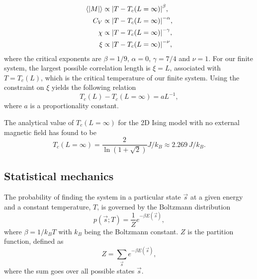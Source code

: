 \begin{align}
    \expval{\abs{M}} & \propto \abs{T - T_c(L=\infty)}^\beta, \label{eq:crit_expo_mag} \\
    C_V & \propto \abs{T - T_c(L=\infty)}^{-\alpha}, \label{eq:crit_expo_heatcap} \\ 
    \chi & \propto \abs{T - T_c(L=\infty)}^{-\gamma}, \label{eq:crit_expo_mag_susc} \\ 
    \xi & \propto \abs{T - T_c(L=\infty)}^{-\nu}, \label{eq:crit_expo_corr_length}
\end{align}
where the critical exponents are $\beta=1/9$, $\alpha=0$, $\gamma=7/4$ and $\nu=1$. For our finite system, the largest possible correlation length is $\xi=L$, associated with $T=T_c(L)$, which is the critical temperature of our finite system. Using the constraint on $\xi$ yields the following relation 
\begin{equation}
    T_c(L) - T_c(L=\infty) = aL^{-1}, \label{eq:finite_size_scaling_relation}
\end{equation}  
where $a$ is a proportionality constant. 

The analytical value of $T_c(L=\infty)$ for the 2D Ising model with no external magnetic field has found to be \cite{Onsager_Ising2D}
\begin{equation}
    T_c(L=\infty) = \frac{2}{\ln(1+\sqrt{2})} J/k_B \approx 2.269\,J/k_B. \label{eq:onsager_critical_temperature}
\end{equation}


\subsection{Statistical mechanics}\label{subsec_theory:statistical_mechanics}

The probability of finding the system in a particular state $\vec{s}$ at a given energy and a constant temperature, $T$, is governed by the Boltzmann distribution 
\begin{equation}\label{eq:boltzmann_distr}
    p(\vec{s};T) = \frac{1}{Z}e^{-\beta E(\vec{s})}, 
\end{equation} 
where $\beta=1/k_B T$ with $k_B$ being the Boltzmann constant. $Z$ is the partition function, defined as 
\begin{equation}\label{eq:partition_function}
    Z = \sum_\vec{s} e^{-\beta E(\vec{s})},
\end{equation}  
where the sum goes over all possible states $\vec{s}$. 

